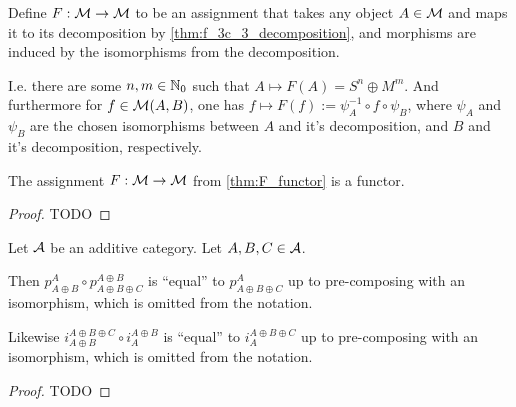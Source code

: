 \begin{definition} \label{thm:F_functor}
    Define \( F: {\mathcal{M}} \to {\mathcal{M}} \) to be an assignment that takes any object \( A \in {\mathcal{M}} \) and maps it to its decomposition by \autoref{thm:f_3c_3_decomposition}, and morphisms are induced by the isomorphisms from the decomposition. 
    
    I.e. there are some \( n, m \in {\mathbb{N}}_0 \) such that \( A \mapsto F(A) = S^n \oplus M^m \). And furthermore for \( f \in {\mathcal{M}}(A, B) \), one has \( f \mapsto F(f) := \psi_A^{-1} \circ f \circ \psi_B \), where \( \psi_A \) and \( \psi_B \) are the chosen isomorphisms between \( A \) and it's decomposition, and \( B \) and it's decomposition, respectively.
\end{definition}

\begin{lemma}
    The assignment \( F: {\mathcal{M}} \to {\mathcal{M}} \) from \autoref{thm:F_functor} is a functor.
\end{lemma}
\begin{proof}
    TODO
\end{proof}

\begin{lemma} \label{lem:projection_unique}
    Let \( {\mathcal{A}} \) be an additive category. Let \( A, B, C \in {\mathcal{A}} \).

    Then \( p_{A \oplus B}^A \circ p_{A \oplus B \oplus C}^{A \oplus B} \) is ``equal'' to \( p_{A \oplus B \oplus C}^A \) up to pre-composing with an isomorphism, which is omitted from the notation.
    
    Likewise \( i_{A \oplus B}^{A \oplus B \oplus C} \circ i_A^{A \oplus B} \) is ``equal'' to \( i_A^{A \oplus B \oplus C} \) up to pre-composing with an isomorphism, which is omitted from the notation.
\end{lemma}
\begin{proof}
    TODO
\end{proof}

